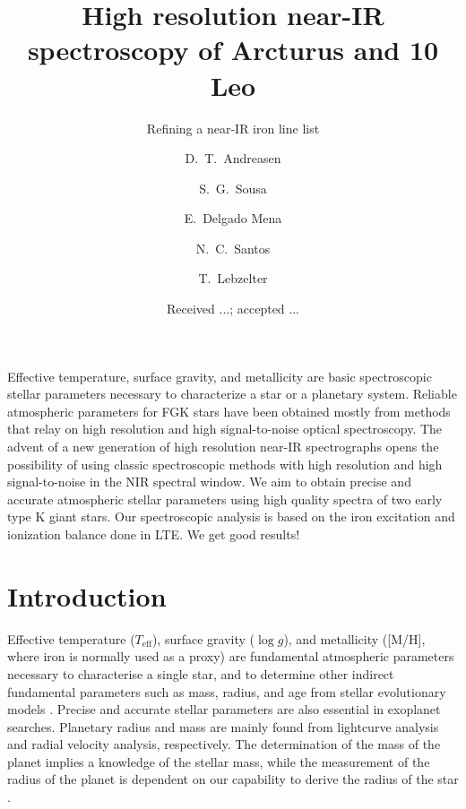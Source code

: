 \documentclass{aa}
\begin{document}
\title{High resolution near-IR spectroscopy of Arcturus and 10 Leo}
\subtitle{Refining a near-IR iron line list}


\author{ D.~T.~Andreasen
    \and S.~G.~Sousa
    \and E.~Delgado Mena
    \and N.~C.~Santos
    \and T.~Lebzelter}







\date{Received ...; accepted ...}

\abstract
{Effective temperature, surface gravity, and metallicity are basic
spectroscopic stellar parameters necessary to characterize
a star or a planetary system. Reliable atmospheric parameters for
FGK stars have been obtained mostly from methods that relay on high
resolution and high signal-to-noise optical spectroscopy. The
advent of a new generation of high resolution near-IR spectrographs
opens the possibility of using classic spectroscopic methods with
high resolution and high signal-to-noise in the NIR spectral window.}
{We aim to obtain precise and accurate atmospheric stellar parameters using
high quality spectra of two early type K giant stars.}
{Our spectroscopic analysis is based on the iron excitation and ionization
balance done in LTE.}
{We get good results!}
{}



\maketitle



\section{Introduction}
\label{sec:introduction}

Effective temperature ($T_\mathrm{eff}$), surface gravity ($\log g$),
and metallicity ([M/H], where iron is normally used as a proxy)
are fundamental atmospheric parameters necessary to characterise a single
star, and to determine other indirect fundamental parameters
such as mass, radius, and age from stellar evolutionary models
\citep[see e.g.][]{Girardi2000,Dotter2008,Baraffe2015}.
Precise and accurate stellar parameters are also essential in
exoplanet searches. Planetary radius and mass are mainly found from
lightcurve analysis and radial velocity analysis, respectively. The
determination of the mass of the planet implies a knowledge of the
stellar mass, while the measurement of the radius of the planet
is dependent on our capability to derive the radius of the star
\citep[see e.g.][]{Torres2008,Ammler2009,Torres2012}.
\end{document}
